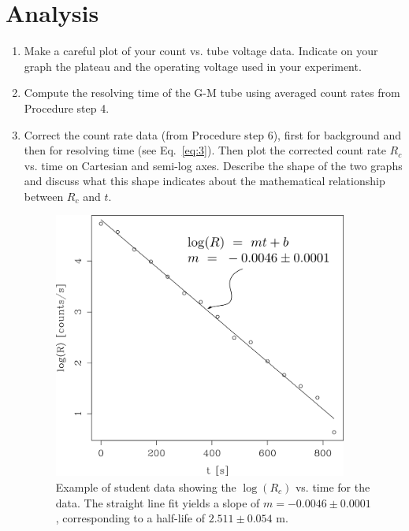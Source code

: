 \section{Analysis}

\begin{enumerate}
\item Make a careful plot of your count vs. tube voltage data.
Indicate on your graph the plateau and the operating voltage used in
your experiment.

\item Compute the resolving time of the G-M tube using averaged count
rates from Procedure step 4.

\item Correct the \bam count rate data (from Procedure step 6), first for
  background and then for resolving time (see Eq.~\ref{eq:3}).  Then plot the
  corrected count rate $R_{c}$ vs. time on Cartesian and semi-log axes.
  Describe the shape of the two graphs and discuss what this shape indicates
  about the mathematical relationship between $R_{c}$ and $t$.

\begin{figure}
\begin{centering}
\includegraphics[width=3.8in]{../images/ba137m.png}
\caption{Example of student data showing the $\log(R_c)$ vs. time for the \bam data.  The straight line fit yields a slope of $m=-0.0046\pm0.0001$, corresponding to a \bam half-life of $2.511\pm0.054$ m. }
\label{fig:rate-V}
\end{centering}
\end{figure}


\end{enumerate}
